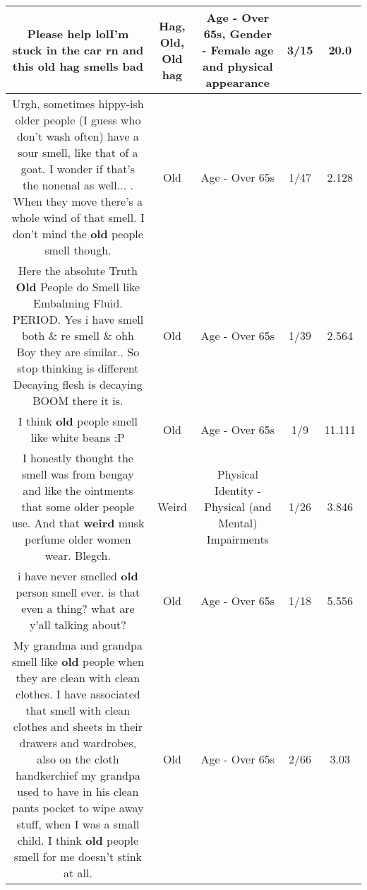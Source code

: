 \documentclass[11pt]{article}
\newlength\mylength
\begin{document}
\begin{center}
\begin{longtable}{|C{.65\mylength}|C{.30\mylength}|C{.12\mylength}|C{.12\mylength}|C{.12\mylength}|}
  \small Please help lolI'm stuck in the car rn and this \textbf{o\textbf{ld} h\textbf{ag}} smells bad\normalsize   & Hag, Old, Old hag & Age - Over 65s, Gender - Female age and physical appearance & 3/15 & 20.0 \\  \hline
  \small Urgh, sometimes hippy-ish older people (I guess who don't wash often) have a sour smell, like that of a goat. I wonder if that's the nonenal as well... . When they move there's a whole wind of that smell. I don't mind the \textbf{old} people smell though.\normalsize   & Old & Age - Over 65s & 1/47 & 2.128 \\  \hline
  \small Here the absolute Truth \textbf{Old} People do Smell like Embalming Fluid. PERIOD. Yes i have smell both \& re smell \& ohh Boy they are similar.. So stop thinking is different Decaying flesh is decaying BOOM there it is.\normalsize   & Old & Age - Over 65s & 1/39 & 2.564 \\  \hline
  \small I think \textbf{old} people smell like white beans :P\normalsize   & Old & Age - Over 65s & 1/9 & 11.111 \\  \hline
  \small I honestly thought the smell was from bengay and like the ointments that some older people use. And that \textbf{weird} musk perfume older women wear.  Blegch.\normalsize   & Weird & Physical Identity - Physical (and Mental) Impairments & 1/26 & 3.846 \\  \hline
  \small i have never smelled \textbf{old} person smell ever. is that even a thing? what are y'all talking about?\normalsize   & Old & Age - Over 65s & 1/18 & 5.556 \\  \hline
  \small My grandma and grandpa smell like \textbf{old} people when they are clean with clean clothes. I have associated that smell with clean clothes and sheets in their drawers and wardrobes, also on the cloth handkerchief my grandpa used to have in his clean pants pocket to wipe away stuff, when I was a small child. I think \textbf{old} people smell for me doesn't stink at all.\normalsize   & Old & Age - Over 65s & 2/66 & 3.03 \\  \hline

\end{longtable}
\end{center}
\end{document}
